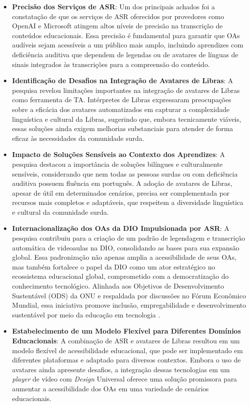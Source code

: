 \begin{itemize}
    \item \textbf{Precisão dos Serviços de ASR}: Um dos principais achados foi a constatação de que os serviços de ASR oferecidos por provedores como OpenAI e Microsoft atingem altos níveis de precisão na transcrição de conteúdos educacionais. Essa precisão é fundamental para garantir que OAs audíveis sejam acessíveis a um público mais amplo, incluindo aprendizes com deficiência auditiva que dependem de legendas ou de avatares de línguas de sinais integrados às transcrições para a compreensão do conteúdo.

    \item \textbf{Identificação de Desafios na Integração de Avatares de Libras}: A pesquisa revelou limitações importantes na integração de avatares de Libras como ferramenta de TA. Intérpretes de Libras expressaram preocupações sobre a eficácia dos avatares automatizados em capturar a complexidade linguística e cultural da Libras, sugerindo que, embora tecnicamente viáveis, essas soluções ainda exigem melhorias substanciais para atender de forma eficaz às necessidades da comunidade surda.

    \item \textbf{Impacto de Soluções Sensíveis ao Contexto dos Aprendizes}: A pesquisa destacou a importância de soluções bilíngues e culturalmente sensíveis, considerando que nem todas as pessoas surdas ou com deficiência auditiva possuem fluência em português. A adoção de avatares de Libras, apesar de útil em determinados cenários, precisa ser complementada por recursos mais completos e adaptáveis, que respeitem a diversidade linguística e cultural da comunidade surda.

    \item \textbf{Internacionalização dos OAs da DIO Impulsionada por ASR}: A pesquisa contribuiu para a criação de um padrão de legendagem e transcrição automática de videoaulas na DIO, consolidando as bases para sua expansão global. Essa padronização não apenas amplia a acessibilidade de seus OAs, mas também fortalece o papel da DIO como um ator estratégico no ecossistema educacional global, comprometido com a democratização do conhecimento tecnológico. Alinhada aos Objetivos de Desenvolvimento Sustentável (ODS) da ONU e respaldada por discussões no Fórum Econômico Mundial, essa iniciativa promove inclusão, empregabilidade e desenvolvimento sustentável por meio da educação em tecnologia \cite{dio2023}.

    \item \textbf{Estabelecimento de um Modelo Flexível para Diferentes Domínios Educacionais}: A combinação de ASR e avatares de Libras resultou em um modelo flexível de acessibilidade educacional, que pode ser implementado em diferentes plataformas e adaptado para diversos contextos. Embora o uso de avatares ainda apresente desafios, a integração dessas tecnologias em um \textit{player} de vídeo com \textit{Design} Universal oferece uma solução promissora para aumentar a acessibilidade dos OAs em uma variedade de cenários educacionais.
\end{itemize}

